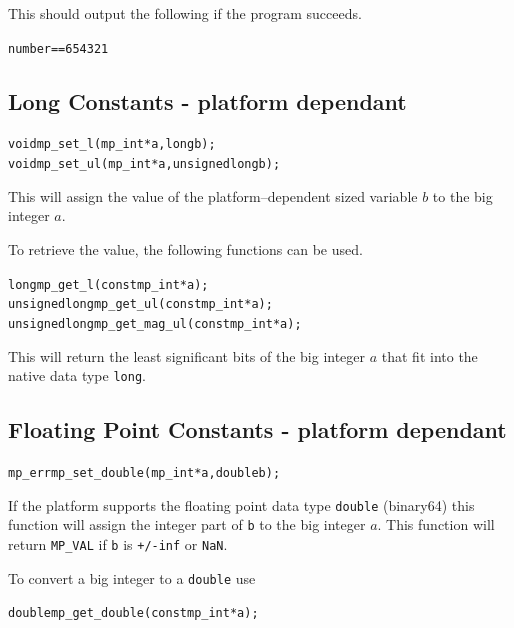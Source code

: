 \documentclass[synpaper]{book}
\begin{document}
This should output the following if the program succeeds.

\begin{alltt}
number == 654321
\end{alltt}

\subsection{Long Constants - platform dependant}

 
\begin{alltt}
void mp_set_l (mp_int *a, long b);
void mp_set_ul (mp_int *a, unsigned long b);
\end{alltt}

This will assign the value of the platform--dependent sized variable $b$ to the big integer $a$.

To retrieve the value, the following functions can be used.

  
\begin{alltt}
long mp_get_l (const mp_int *a);
unsigned long mp_get_ul (const mp_int *a);
unsigned long mp_get_mag_ul (const mp_int *a);
\end{alltt}

This will return the least significant bits of the big integer $a$ that fit into the native data
type \texttt{long}.

\subsection{Floating Point Constants - platform dependant}

\begin{alltt}
mp_err mp_set_double(mp_int *a, double b);
\end{alltt}

If the platform supports the floating point data type \texttt{double} (binary64) this function will
assign the integer part of \texttt{b} to the big integer $a$. This function will return
\texttt{MP\_VAL} if \texttt{b} is \texttt{+/-inf} or \texttt{NaN}.

To convert a big integer to a \texttt{double} use

\begin{alltt}
double mp_get_double(const mp_int *a);
\end{alltt}
\end{document}
